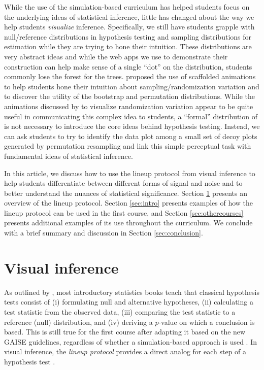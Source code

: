 \documentclass[12pt]{article}
\begin{document}
While the use of the simulation-based curriculum has helped students
focus on the underlying ideas of statistical inference, little has
changed about the way we help students \emph{visualize} inference.
Specifically, we still have students grapple with null/reference
distributions in hypothesis testing and sampling distributions for
estimation while they are trying to hone their intuition. These
distributions are very abstract ideas and while the web apps we use to
demonstrate their construction can help make sense of a single ``dot''
on the distribution, students commonly lose the forest for the trees.
\citet{wild2017} proposed the use of scaffolded animations to help
students hone their intuition about sampling/randomization variation and
to discover the utility of the bootstrap and permutation distributions.
While the animations discussed by \citet{wild2017} to visualize
randomization variation appear to be quite useful in communicating this
complex idea to students, a ``formal'' distribution of is not necessary
to introduce the core ideas behind hypothesis testing. Instead, we can
ask students to try to identify the data plot among a small set of decoy
plots generated by permutation resampling and link this simple
perceptual task with fundamental ideas of statistical inference.

In this article, we discuss how to use the lineup protocol from visual
inference to help students differentiate between different forms of
signal and noise and to better understand the nuances of statistical
significance. Section \ref{sec:vizinf} presents an overview of the
lineup protocol. Section \ref{sec:intro} presents examples of how the
lineup protocol can be used in the first course, and Section
\ref{sec:othercourses} presents additional examples of its use
throughout the curriculum. We conclude with a brief summary and
discussion in Section \ref{sec:conclusion}.

\section{Visual inference}
\label{sec:vizinf}

As outlined by \citet{Cobb-2007uo}, most introductory statistics books
teach that classical hypothesis tests consist of (i) formulating null
and alternative hypotheses, (ii) calculating a test statistic from the
observed data, (iii) comparing the test statistic to a reference (null)
distribution, and (iv) deriving a \(p\)-value on which a conclusion is
based. This is still true for the first course after adapting it based
on the new GAISE guidelines, regardless of whether a simulation-based
approach is used \citep[cf.~][]{Lock2017, tintle2015, introstats}. In
visual inference, the \emph{lineup protocol} provides a direct analog
for each step of a hypothesis test \citep{Buja-2009bd}.
\end{document}
